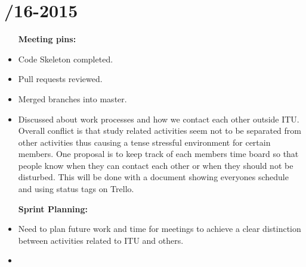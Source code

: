 \section{/16-2015} %
\attend{\at}{\nat}{\at}{\at}


\begin{itemize}
	\item [\textbf{Meeting pins:}]
	\item Code Skeleton completed.
	\item Pull requests reviewed.
    \item Merged branches into master.
    \item Discussed about work processes and how we contact each other outside ITU. Overall conflict is that study related activities seem not to be separated from other activities thus causing a tense stressful environment for certain members. One proposal is to keep track of each members time board  so that people know when they can contact each other or when they should not be disturbed. This will be done with a document showing everyones schedule and using status tags on Trello. 
\end{itemize}

\begin{itemize}
	\item [\textbf{Sprint Planning:}]
	\item Need to plan future work and time for meetings to achieve a clear distinction between activities related to ITU and others. 
	\item 
\end{itemize}